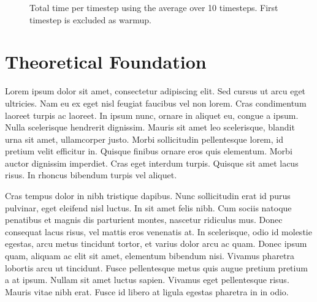 \documentclass[a4paper,11pt]{kth-mag}
\begin{document}
\begin{figure}
  \centering
  \caption{Total time per timestep using the average over 10 timesteps. First timestep is excluded as warmup.}
\end{figure}

\chapter{Theoretical Foundation}

Lorem ipsum dolor sit amet, consectetur adipiscing elit. Sed cursus ut arcu eget ultricies. Nam eu ex eget nisl feugiat faucibus vel non lorem. Cras condimentum laoreet turpis ac laoreet. In ipsum nunc, ornare in aliquet eu, congue a ipsum. Nulla scelerisque hendrerit dignissim. Mauris sit amet leo scelerisque, blandit urna sit amet, ullamcorper justo. Morbi sollicitudin pellentesque lorem, id pretium velit efficitur in. Quisque finibus ornare eros quis elementum. Morbi auctor dignissim imperdiet. Cras eget interdum turpis. Quisque sit amet lacus risus. In rhoncus bibendum turpis vel aliquet.

Cras tempus dolor in nibh tristique dapibus. Nunc sollicitudin erat id purus pulvinar, eget eleifend nisl luctus. In sit amet felis nibh. Cum sociis natoque penatibus et magnis dis parturient montes, nascetur ridiculus mus. Donec consequat lacus risus, vel mattis eros venenatis at. In scelerisque, odio id molestie egestas, arcu metus tincidunt tortor, et varius dolor arcu ac quam. Donec ipsum quam, aliquam ac elit sit amet, elementum bibendum nisi. Vivamus pharetra lobortis arcu ut tincidunt. Fusce pellentesque metus quis augue pretium pretium a at ipsum. Nullam sit amet luctus sapien. Vivamus eget pellentesque risus. Mauris vitae nibh erat. Fusce id libero at ligula egestas pharetra in in odio.
\end{document}
